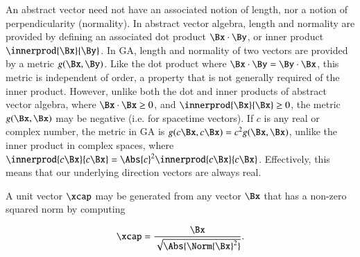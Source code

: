 An abstract vector need not have an associated notion of length, nor a notion of perpendicularity (normality).
In abstract vector algebra, length and normality are provided by defining an associated dot product \(\Bx \cdot \By\), or inner product \(\innerprod{\Bx}{\By}\).
In GA, length and normality of two vectors are provided by a metric \(g(\Bx, \By)\).
Like the dot product where \( \Bx \cdot \By = \By \cdot \Bx\), this metric is independent of order, a property that is not generally required of the inner product.
However, unlike both the dot and inner products of abstract vector algebra, where \( \Bx \cdot \Bx \ge 0\), and \( \innerprod{\Bx}{\Bx} \ge 0\), the metric \(g(\Bx, \Bx)\) may be negative (i.e. for spacetime vectors).
If \(c \) is any real or complex number, the metric in GA is \( g(c \Bx, c \Bx) = c^2 g(\Bx, \Bx)\), unlike the inner product in complex spaces, where \( \innerprod{c \Bx}{c \Bx} = \Abs{c}^2 \innerprod{c \Bx}{c \Bx} \).
Effectively, this means that our underlying direction vectors are always real.






A unit vector \( \xcap \) may be generated from any vector \( \Bx \) that has a non-zero squared norm by computing

\begin{dmath}\label{eqn:multivector:220}
\xcap = \frac{\Bx}{\sqrt{\Abs{\Norm{\Bx}^2}}}.
\end{dmath}


